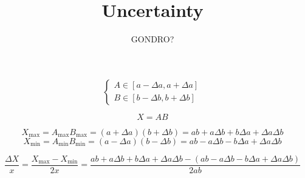 \documentclass[a4paper]{article}
\title{Uncertainty}
\author{GONDRO?}
\begin{document}
\maketitle

\[\begin{cases}
    A\in[a-\Delta a,a+\Delta a]\\
    B\in[b-\Delta b,b+\Delta b]
\end{cases}\]

\[X=AB\]

\[X_{\max}=A_{\max}B_{\max}=(a+\Delta a)(b+\Delta b)=ab+a\Delta b+b\Delta a+\Delta a\Delta b\]
\[X_{\min}=A_{\min}B_{\min}=(a-\Delta a)(b-\Delta b)=ab-a\Delta b-b\Delta a+\Delta a\Delta b\]

\[\frac{\Delta X}x=\frac{X_{\max}-X_{\min}}{2x}=\frac{ab+a\Delta b+b\Delta a+\Delta a\Delta b-(ab-a\Delta b-b\Delta a+\Delta a\Delta b)}{2ab}\]
\end{document}
